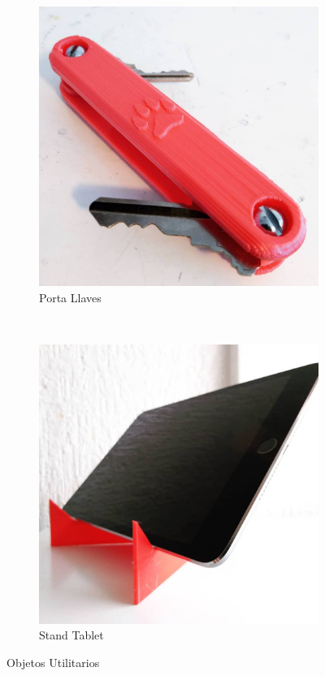 \documentclass[]{article}
\begin{document}
\begin{figure}[h!]
	\centering
	\begin{subfigure}[b]{0.4\textwidth}
			\includegraphics[width=1\textwidth]{portallaves}	
		\caption{Porta Llaves}
	\label{fig:PortaLlaves}
	\end{subfigure}
	~ %
	\begin{subfigure}[b]{0.4\textwidth}	
		\includegraphics[width=1\textwidth]{stand1}
		\caption{Stand Tablet}
		\label{fig:StandTablet}
	\end{subfigure}
	\caption{Objetos Utilitarios}
	\label{fig:utilidad3D}
\end{figure}
\end{document}
